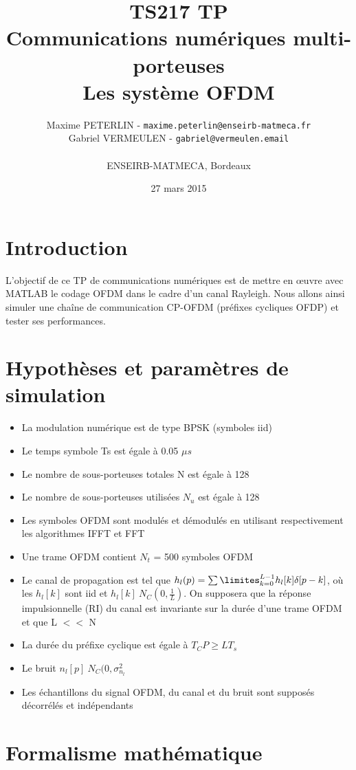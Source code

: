 \documentclass[11pt]{article}
\title{\textbf{TS217 TP}\\Communications numériques multi-porteuses\\Les système OFDM}
\author{Maxime PETERLIN - \texttt{maxime.peterlin@enseirb-matmeca.fr}\\
Gabriel VERMEULEN - \texttt{gabriel@vermeulen.email} \\\\{ENSEIRB-MATMECA, Bordeaux}}
\date{27 mars 2015}
\begin{document}
\maketitle
\tableofcontents

\newpage

\section{Introduction}

L'objectif de ce TP de communications numériques est de mettre en œuvre avec MATLAB le codage OFDM dans le cadre d'un canal Rayleigh. Nous allons ainsi simuler une chaîne de communication CP-OFDM (préfixes cycliques OFDP) et tester ses performances.

	\section{Hypothèses et paramètres de simulation}
		
		\begin{itemize}
			\item La modulation numérique est de type BPSK (symboles iid)
			\item Le temps symbole Ts est égale à 0.05 $\mu s$
			\item Le nombre de sous-porteuses totales N est égale à 128
			\item Le nombre de sous-porteuses utilisées $N_u$ est égale à 128
			\item Les symboles OFDM sont modulés et démodulés en utilisant respectivement les algorithmes IFFT et FFT
			\item Une trame OFDM contient $N_t$ = 500 symboles OFDM
			\item Le canal de propagation est tel que $h_l(p) = \sum\limites_{k=0}^{L-1} h_l[k] \delta [p-k]$, où les $h_l[k]$ sont iid et $h_l[k] ~ N_C(0, \frac{1}{L})$. On supposera que la réponse impulsionnelle (RI) du canal est invariante sur la durée d'une trame OFDM et que L $<<$ N
			\item La durée du préfixe cyclique est égale à $T_CP \geq LT_s$
			\item Le bruit $n_l[p] ~ N_C(0, \sigma_{n_l}^2$
			\item Les échantillons du signal OFDM, du canal et du bruit sont supposés décorrélés et indépendants
		\end{itemize}

	\section{Formalisme mathématique}
	
\end{document}
